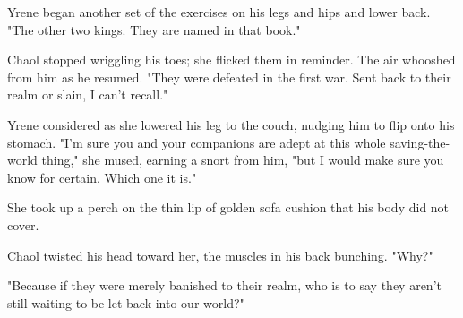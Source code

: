 Yrene began another set of the exercises on his legs and hips and lower back.
"The other two kings.
They are named in that book."

Chaol stopped wriggling his toes; she flicked them in reminder.
The air whooshed from him as he resumed.
"They were defeated in the first war.
Sent back to their realm or slain, I can't recall."

Yrene considered as she lowered his leg to the couch, nudging him to flip onto his stomach.
"I'm sure you and your companions are adept at this whole saving-the-world thing," she mused, earning a snort from him, "but I would make sure you know for certain.
Which one it is."

She took up a perch on the thin lip of golden sofa cushion that his body did not cover.

Chaol twisted his head toward her, the muscles in his back bunching.
"Why?"

"Because if they were merely banished to their realm, who is to say they aren't still waiting to be let back into our world?"

